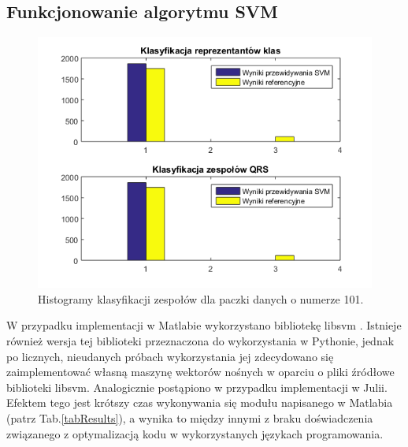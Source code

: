 \subsection{Funkcjonowanie algorytmu SVM}

\begin{figure}[!htp]
	\centering
	\includegraphics[width=15cm]{Grafika/101_2_3}
	\caption{Histogramy klasyfikacji zespołów dla paczki danych o numerze 101.}
	\label{fig:hist1}
\end{figure}

\qquad W przypadku implementacji w Matlabie wykorzystano bibliotekę libsvm \cite{csie}. Istnieje również wersja tej biblioteki przeznaczona do wykorzystania w Pythonie, jednak po licznych, nieudanych próbach wykorzystania jej zdecydowano się zaimplementować własną maszynę wektorów nośnych w oparciu o pliki źródłowe biblioteki libsvm. Analogicznie postąpiono w przypadku implementacji w Julii. Efektem tego jest krótszy czas wykonywania się modułu napisanego w Matlabia (patrz Tab.\ref{tabResults}), a wynika to między innymi z braku doświadczenia związanego z optymalizacją kodu w wykorzystanych językach programowania.

